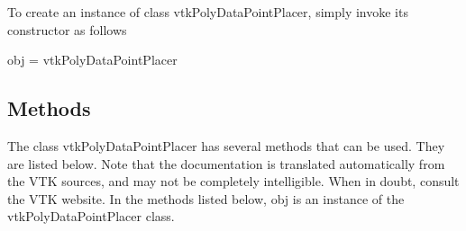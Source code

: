 To create an instance of class vtk\-Poly\-Data\-Point\-Placer, simply invoke its constructor as follows \begin{DoxyVerb}  obj = vtkPolyDataPointPlacer
\end{DoxyVerb}
 \hypertarget{vtkwidgets_vtkxyplotwidget_Methods}{}\subsection{Methods}\label{vtkwidgets_vtkxyplotwidget_Methods}
The class vtk\-Poly\-Data\-Point\-Placer has several methods that can be used. They are listed below. Note that the documentation is translated automatically from the V\-T\-K sources, and may not be completely intelligible. When in doubt, consult the V\-T\-K website. In the methods listed below, {\ttfamily obj} is an instance of the vtk\-Poly\-Data\-Point\-Placer class. 
